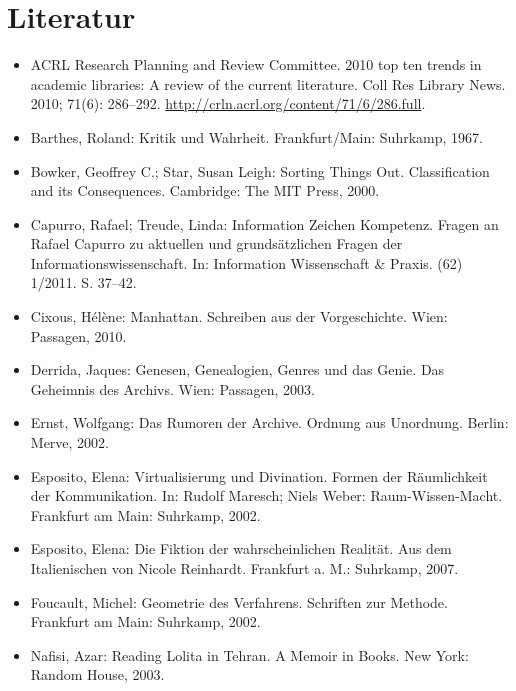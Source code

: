 \documentclass[output=paper]{langscibook}
\begin{document}
\hypertarget{literatur}{%
\section*{Literatur}\label{literatur}}
\begin{itemize}

\item ACRL Research Planning and Review Committee. 2010 top ten trends in academic libraries: A review of the current literature. Coll Res Library News. 2010; 71(6): 286--292. \url{http://crln.acrl.org/content/71/6/286.full}.

\item Barthes, Roland: Kritik und Wahrheit. Frankfurt/Main: Suhrkamp, 1967.

\item Bowker, Geoffrey C.; Star, Susan Leigh: Sorting Things Out. Classification and its Consequences. Cambridge: The MIT Press, 2000.

\item Capurro, Rafael; Treude, Linda: Information Zeichen Kompetenz. Fragen an Rafael Capurro zu aktuellen und grundsätzlichen Fragen der Informationswissenschaft. In: Information Wissenschaft \& Praxis. (62) 1/2011. S. 37--42.

\item Cixous, Hélène: Manhattan. Schreiben aus der Vorgeschichte. Wien: Passagen, 2010.

\item Derrida, Jaques: Genesen, Genealogien, Genres und das Genie. Das Geheimnis des Archivs. Wien: Passagen, 2003.

\item Ernst, Wolfgang: Das Rumoren der Archive. Ordnung aus Unordnung. Berlin: Merve, 2002.

\item Esposito, Elena: Virtualisierung und Divination. Formen der Räumlichkeit der Kommunikation. In: Rudolf Maresch; Niels Weber: Raum-Wissen-Macht. Frankfurt am Main: Suhrkamp, 2002.

\item Esposito, Elena: Die Fiktion der wahrscheinlichen Realität. Aus dem Italienischen von Nicole Reinhardt. Frankfurt a. M.: Suhrkamp, 2007.

\item Foucault, Michel: Geometrie des Verfahrens. Schriften zur Methode. Frankfurt am Main: Suhrkamp, 2002.

\item Nafisi, Azar: Reading Lolita in Tehran. A Memoir in Books. New York: Random House, 2003.


\end{itemize}
\end{document}
